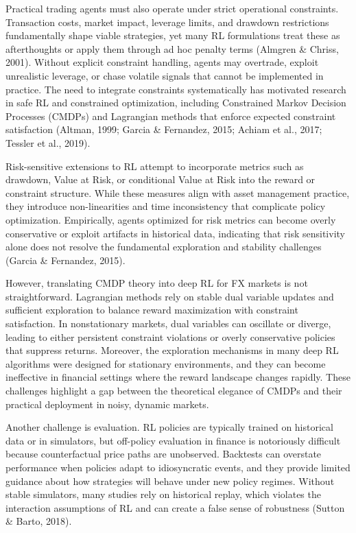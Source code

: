 \documentclass[12pt,a4paper]{article}
\begin{document}
Practical trading agents must also operate under strict operational constraints. Transaction costs, market impact, leverage limits, and drawdown restrictions fundamentally shape viable strategies, yet many RL formulations treat these as afterthoughts or apply them through ad hoc penalty terms (Almgren \& Chriss, 2001). Without explicit constraint handling, agents may overtrade, exploit unrealistic leverage, or chase volatile signals that cannot be implemented in practice. The need to integrate constraints systematically has motivated research in safe RL and constrained optimization, including Constrained Markov Decision Processes (CMDPs) and Lagrangian methods that enforce expected constraint satisfaction (Altman, 1999; Garcia \& Fernandez, 2015; Achiam et al., 2017; Tessler et al., 2019).

Risk-sensitive extensions to RL attempt to incorporate metrics such as drawdown, Value at Risk, or conditional Value at Risk into the reward or constraint structure. While these measures align with asset management practice, they introduce non-linearities and time inconsistency that complicate policy optimization. Empirically, agents optimized for risk metrics can become overly conservative or exploit artifacts in historical data, indicating that risk sensitivity alone does not resolve the fundamental exploration and stability challenges (Garcia \& Fernandez, 2015).

However, translating CMDP theory into deep RL for FX markets is not straightforward. Lagrangian methods rely on stable dual variable updates and sufficient exploration to balance reward maximization with constraint satisfaction. In nonstationary markets, dual variables can oscillate or diverge, leading to either persistent constraint violations or overly conservative policies that suppress returns. Moreover, the exploration mechanisms in many deep RL algorithms were designed for stationary environments, and they can become ineffective in financial settings where the reward landscape changes rapidly. These challenges highlight a gap between the theoretical elegance of CMDPs and their practical deployment in noisy, dynamic markets.

Another challenge is evaluation. RL policies are typically trained on historical data or in simulators, but off-policy evaluation in finance is notoriously difficult because counterfactual price paths are unobserved. Backtests can overstate performance when policies adapt to idiosyncratic events, and they provide limited guidance about how strategies will behave under new policy regimes. Without stable simulators, many studies rely on historical replay, which violates the interaction assumptions of RL and can create a false sense of robustness (Sutton \& Barto, 2018).
\end{document}
